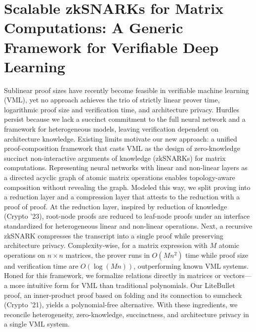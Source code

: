 \documentclass[11pt]{article}
\theoremstyle{definition}
\theoremstyle{remark}
\theoremstyle{plain}
\begin{document}
\section{\cite{cryptoeprint:2025/1646} Scalable zkSNARKs for Matrix Computations: A Generic Framework for Verifiable Deep Learning}
Sublinear proof sizes have recently become feasible in verifiable machine learning (VML), yet no approach achieves the trio of strictly linear prover time, logarithmic proof size and verification time, and architecture privacy. Hurdles persist because we lack a succinct commitment to the full neural network and a framework for heterogeneous models, leaving verification dependent on architecture knowledge. Existing limits motivate our new approach: a unified proof-composition framework that casts VML as the design of zero-knowledge succinct non-interactive arguments of knowledge (zkSNARKs) for matrix computations. Representing neural networks with linear and non-linear layers as a directed acyclic graph of atomic matrix operations enables topology-aware composition without revealing the graph. Modeled this way, we split proving into a reduction layer and a compression layer that attests to the reduction with a proof of proof. At the reduction layer, inspired by reduction of knowledge (Crypto '23), root-node proofs are reduced to leaf-node proofs under an interface standardized for heterogeneous linear and non-linear operations. Next, a recursive zkSNARK compresses the transcript into a single proof while preserving architecture privacy. Complexity-wise, for a matrix expression with $M$ atomic operations on $n \times n$ matrices, the prover runs in $O(M n^2)$ time while proof size and verification time are $O(\log(M n))$, outperforming known VML systems. Honed for this framework, we formalize relations directly in matrices or vectors---a more intuitive form for VML than traditional polynomials. Our LiteBullet proof, an inner-product proof based on folding and its connection to sumcheck (Crypto '21), yields a polynomial-free alternative. With these ingredients, we reconcile heterogeneity, zero-knowledge, succinctness, and architecture privacy in a single VML system.

%
%
\printbibliography
\end{document}
